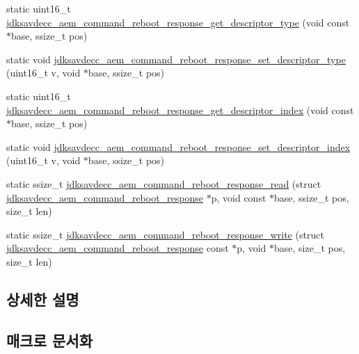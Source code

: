 \begin{DoxyCompactItemize}
\item 
static uint16\+\_\+t \hyperlink{group__command__reboot__response_gaae268cb41b1e64236e44c48c421a3967}{jdksavdecc\+\_\+aem\+\_\+command\+\_\+reboot\+\_\+response\+\_\+get\+\_\+descriptor\+\_\+type} (void const $\ast$base, ssize\+\_\+t pos)
\item 
static void \hyperlink{group__command__reboot__response_ga762d5fed4c95ec1874fca622c6caa06b}{jdksavdecc\+\_\+aem\+\_\+command\+\_\+reboot\+\_\+response\+\_\+set\+\_\+descriptor\+\_\+type} (uint16\+\_\+t v, void $\ast$base, ssize\+\_\+t pos)
\item 
static uint16\+\_\+t \hyperlink{group__command__reboot__response_ga543d54815a673e0cda21a14b54073b73}{jdksavdecc\+\_\+aem\+\_\+command\+\_\+reboot\+\_\+response\+\_\+get\+\_\+descriptor\+\_\+index} (void const $\ast$base, ssize\+\_\+t pos)
\item 
static void \hyperlink{group__command__reboot__response_ga7561a41dfeba6398c2b8a78af8ca09f0}{jdksavdecc\+\_\+aem\+\_\+command\+\_\+reboot\+\_\+response\+\_\+set\+\_\+descriptor\+\_\+index} (uint16\+\_\+t v, void $\ast$base, ssize\+\_\+t pos)
\item 
static ssize\+\_\+t \hyperlink{group__command__reboot__response_ga4c55ee085228ad590101ad2c710834e0}{jdksavdecc\+\_\+aem\+\_\+command\+\_\+reboot\+\_\+response\+\_\+read} (struct \hyperlink{structjdksavdecc__aem__command__reboot__response}{jdksavdecc\+\_\+aem\+\_\+command\+\_\+reboot\+\_\+response} $\ast$p, void const $\ast$base, ssize\+\_\+t pos, size\+\_\+t len)
\item 
static ssize\+\_\+t \hyperlink{group__command__reboot__response_ga6fac8c4842ef9059b0db590afb1b069d}{jdksavdecc\+\_\+aem\+\_\+command\+\_\+reboot\+\_\+response\+\_\+write} (struct \hyperlink{structjdksavdecc__aem__command__reboot__response}{jdksavdecc\+\_\+aem\+\_\+command\+\_\+reboot\+\_\+response} const $\ast$p, void $\ast$base, size\+\_\+t pos, size\+\_\+t len)
\end{DoxyCompactItemize}


\subsection{상세한 설명}


\subsection{매크로 문서화}

